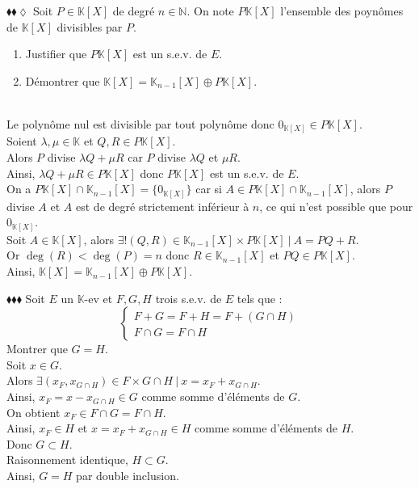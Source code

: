 \documentclass[11pt]{article}
\newcommand*{\K}{\mathbb{K}}
\newcommand*{\N}{\mathbb{N}}
\begin{document}
\begin{exercise}{$\blacklozenge\blacklozenge\lozenge$}{}
    Soit $P\in\K[X]$ de degré $n\in\N$. On note $P\K[X]$ l'ensemble des poynômes de $\K[X]$ divisibles par $P$.
    \begin{enumerate}[topsep=0pt,itemsep=-0.9ex]
        \item Justifier que $P\K[X]$ est un s.e.v. de $E$.
        \item Démontrer que $\K[X] = \K_{n-1}[X] \oplus P\K[X]$.
    \end{enumerate}
    \tcblower\\[0.2cm]
     Le polynôme nul est divisible par tout polynôme donc $0_{\K[X]} \in P\K[X]$.\\
    Soient $\lambda, \mu \in \K$ et $Q, R \in P\K[X]$.\\
    Alors $P$ divise $\lambda Q + \mu R$ car $P$ divise $\lambda Q$ et $\mu R$.\\
    Ainsi, $\lambda Q + \mu R \in P\K[X]$ donc $P\K[X]$ est un s.e.v. de $E$.\\[0.3cm]
     On a $P\K[X] \cap \K_{n-1}[X] = \{0_{\K[X]}\}$ car si $A \in P\K[X] \cap \K_{n-1}[X]$, alors $P$ divise $A$ et $A$ est de degré strictement inférieur à $n$, ce qui n'est possible que pour $0_{\K[X]}$.\\
    Soit $A \in \K[X]$, alors $\exists! (Q, R) \in \K_{n-1}[X] \times P\K[X] ~ | ~ A = PQ + R$.\\
    Or $\deg(R) < \deg(P) = n$ donc $R \in \K_{n-1}[X]$ et $PQ \in P\K[X]$.\\
    Ainsi, $\K[X] = \K_{n-1}[X] \oplus P\K[X]$.
\end{exercise}

\begin{exercise}{$\blacklozenge\blacklozenge\blacklozenge$}{}
    Soit $E$ un $\K$-ev et $F,G,H$ trois s.e.v. de $E$ tels que :
    \begin{equation*}
        \begin{cases}
            F + G = F + H = F + (G \cap H)\\
            F \cap G = F \cap H
        \end{cases}
    \end{equation*}
    Montrer que $G = H$.
    \tcblower\\[0.2cm] 
    \fbox{$\subset$} Soit $x \in G$.\\
    Alors $\exists (x_F, x_{G\cap H}) \in F \times G \cap H ~ | ~ x = x_F + x_{G\cap H}$.\\
    Ainsi, $x_F = x - x_{G\cap H} \in G$ comme somme d'éléments de $G$.\\
    On obtient $x_F \in F \cap G = F \cap H$.\\
    Ainsi, $x_F \in H$ et $x = x_F + x_{G \cap H} \in H$ comme somme d'éléments de $H$.\\
    Donc $G \subset H$.\\[0.3cm]
    \fbox{$\supset$} Raisonnement identique, $H \subset G$.\\
    Ainsi, $G = H$ par double inclusion.
\end{exercise}
\end{document}
